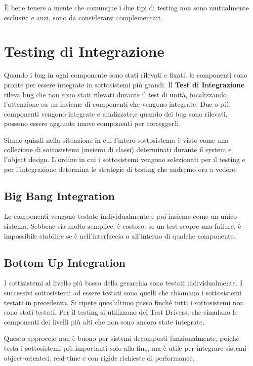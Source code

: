             È bene tenere a mente che comunque i due tipi di testing non sono mutualmente esclusivi e anzi, sono da considerarsi complementari.
            
    \section{Testing di Integrazione}
        Quando i bug in ogni componente sono stati rilevati e fixati, le componenti sono pronte per essere integrate in sottosistemi più grandi. Il \textbf{Test di Integrazione} rileva bug che non sono stati rilevati durante il test di unità, focalizzando l'attenzione su un insieme di componenti che vengono integrate. Due o più componenti vengono integrate e analizzate,e quando dei bug sono rilevati, possono essere aggiunte nuove componenti per correggerli.
        
        Siamo quindi nella situazione in cui l'intero sottosistema è visto come una collezione di sottosistemi (insiemi di classi) determinati durante il system e l'object design. L'ordine in cui i sottosistemi vengono selezionati per il testing e per l'integrazione determina le strategie di testing che andremo ora a vedere.
        
        \subsection{Big Bang Integration}
            Le componenti vengono testate individualmente e poi insieme come un unico sistema. Sebbene sia molto semplice, è costoso: se un test scopre una failure, è impossibile stabilire se è nell'interfaccia o all'interno di qualche componente.
            
        \subsection{Bottom Up Integration}
            I sottisistemi al livello più basso della gerarchia sono testati individualmente. I successivi sottosistemi ad essere testati sono quelli che chiamano i sottosistemi testati in precedenza. Si ripete ques'ultimo passo finché tutti i sottosistemi non sono stati testati. Per il testing si utilizzano dei Test Drivers, che simulano le componenti dei livelli più alti che non sono ancora state integrate.
        
            Questo approccio non è buono per sistemi decomposti funzionalmente, poiché testa i sottosistemi più importanti solo alla fine, ma è utile per integrare sistemi object-oriented, real-time e con rigide richieste di performance.
        
